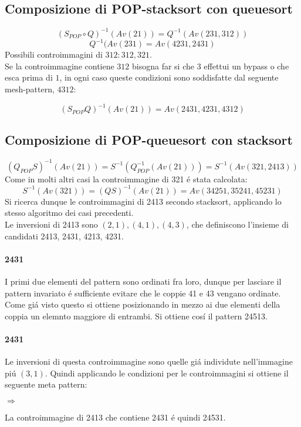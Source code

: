 \subsection*{Composizione di {POP-stacksort} con {queuesort}}
$$(S_{POP}\circ{Q})^{-1}(Av(21))=Q^{-1}(Av(231,312))$$$$Q^{-1}(Av(231)=Av(4231,2431)$$
Possibili controimmagini di $312: 312, 321$.\\
Se la controimmagine contiene $312$ bisogna far si che $3$ effettui un bypass o che esca prima di $1$, in ogni caso queste condizioni sono soddisfatte dal seguente mesh-pattern, $4312$:
\begin{center}
\end{center}
$$(S_{POP}{Q})^{-1}(Av(21))=Av(2431,4231,4312)$$
\subsection*{Composizione di {POP-queuesort} con {stacksort}}
$$(Q_{POP}{S})^{-1}(Av(21)) = S^{-1}(Q_{POP}^{-1}(Av(21))) = S^{-1}(Av(321, 2413))$$
Come in molti altri casi la controimmagine di 321 \'e stata calcolata:$$S^{-1}(Av(321)) = (QS)^{-1}(Av(21)) = Av(34251, 35241, 45231)$$
Si ricerca dunque le controimmagini di 2413 secondo stacksort, applicando lo stesso algoritmo dei casi precedenti.\\
Le inversioni di 2413 sono $(2,1),(4,1),(4,3)$, che definiscono l'insieme di candidati 2413, 2431, 4213, 4231.
\paragraph*{2431} I primi due elementi del pattern sono ordinati fra loro, dunque per lasciare il pattern invariato \'e sufficiente evitare che le coppie 41 e 43 vengano ordinate. Come gi\'a visto questo si ottiene posizionando in mezzo ai due elementi della coppia un elemnto maggiore di entrambi. Si ottiene cos\'i  il pattern 24513.
\paragraph*{2431} Le inversioni di questa controimmagine sono quelle gi\'a individute nell'immagine pi\'u $(3,1)$. Quindi applicando le condizioni per le controimmagini si ottiene il seguente meta pattern:
\begin{center}$\Rightarrow$\end{center}
La controimmagine di 2413 che contiene 2431 \'e quindi 24531.
